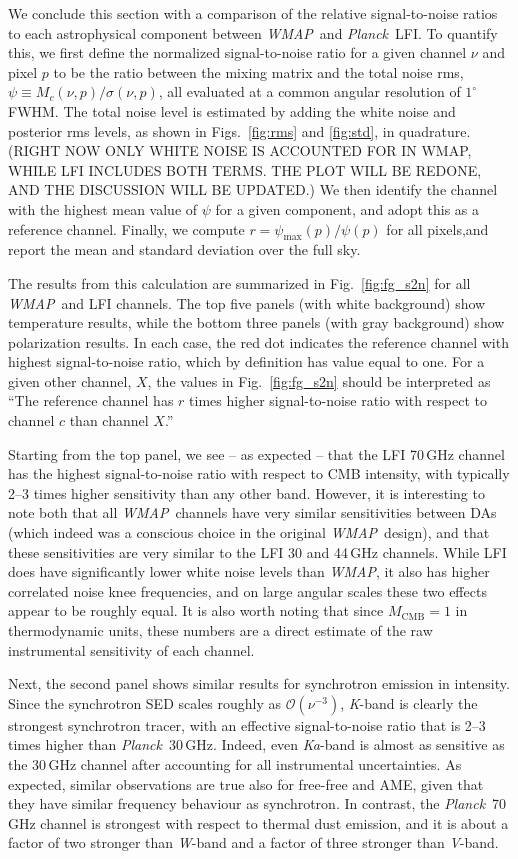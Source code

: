 \documentclass[twocolumn]{../../common/aa}
\def\WMAP{\emph{WMAP}}
\def\Planck{\emph{Planck}}
\newcommand{\K}[0]{\textit K}
\newcommand{\Ka}[0]{\textit{Ka}}
\newcommand{\V}[0]{\textit V}
\newcommand{\W}[0]{\textit W}
\begin{document}
We conclude this section with a comparison of the relative signal-to-noise ratios to each astrophysical component between \WMAP\ and \Planck\ LFI. To quantify this, we first define the normalized signal-to-noise ratio for a given channel $\nu$ and pixel $p$ to be the ratio between the mixing matrix and the total noise rms,  $\psi \equiv M_{c}(\nu, p)/\sigma(\nu, p)$, all evaluated at a common angular resolution of $1^{\circ}$ FWHM. The total noise level is estimated by adding the white noise and posterior rms levels, as shown in Figs.~\ref{fig:rms} and \ref{fig:std}, in quadrature. {\color{red} (RIGHT NOW ONLY WHITE NOISE IS ACCOUNTED FOR IN WMAP, WHILE LFI INCLUDES BOTH TERMS. THE PLOT WILL BE REDONE, AND THE DISCUSSION WILL BE UPDATED.)} We then identify the channel with the highest mean value of $\psi$ for a given component, and adopt this as a reference channel. Finally, we compute $r=\psi_{\mathrm{max}}(p)/\psi(p)$ for all pixels,and report the mean and standard deviation over the full sky.

The results from this calculation are summarized in Fig.~\ref{fig:fg_s2n} for all \WMAP\ and LFI channels. The top five panels (with white background) show temperature results, while the bottom three panels (with gray background) show polarization results. In each case, the red dot indicates the reference channel with highest signal-to-noise ratio, which by definition has value equal to one. For a given other channel, $X$, the values in Fig.~\ref{fig:fg_s2n} should be interpreted as ``The reference channel has $r$ times higher signal-to-noise ratio with respect to channel  $c$ than channel $X$.''

Starting from the top panel, we see -- as expected -- that the LFI 70\,GHz channel has the highest signal-to-noise ratio with respect to CMB intensity, with typically 2--3 times higher sensitivity than any other band. However, it is interesting to note both that all \WMAP\ channels have very similar sensitivities between DAs (which indeed was a conscious choice in the original \WMAP\ design), and that these sensitivities are very similar to the LFI 30 and 44\,GHz channels. While LFI does have significantly lower white noise levels than \WMAP, it also has higher correlated noise knee frequencies, and on large angular scales these two effects appear to be roughly equal. It is also worth noting that since $M_{\mathrm{CMB}}=1$ in thermodynamic units, these numbers are a direct estimate of the raw instrumental sensitivity of each channel.

Next, the second panel shows similar results for synchrotron emission in intensity. Since the synchrotron SED scales roughly as $\mathcal{O}(\nu^{-3})$, \K-band is clearly the strongest synchrotron tracer, with an effective signal-to-noise ratio that is 2--3 times higher than \Planck\ 30\,GHz. Indeed, even \Ka-band is almost as sensitive as the 30\,GHz channel after accounting for all instrumental uncertainties. As expected, similar observations are true also for free-free and AME, given that they have similar frequency behaviour as synchrotron. In contrast, the \Planck\ 70\,GHz channel is strongest with respect to thermal dust emission, and it is about a factor of two stronger than \W-band and a factor of three stronger than \V-band.
\end{document}
